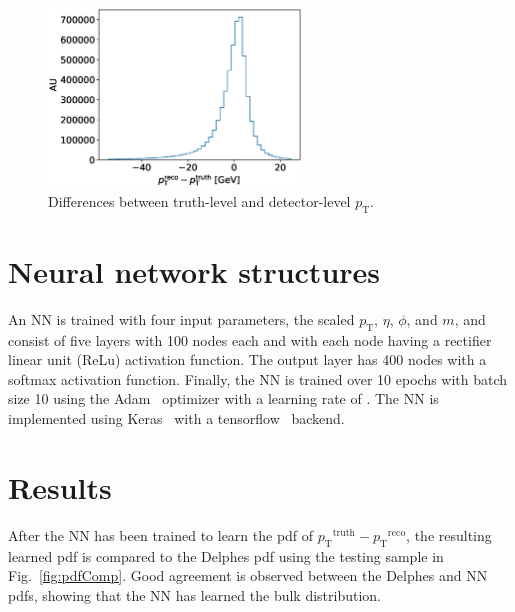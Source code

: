 \documentclass[showpacs,showkeys,preprint,prd,nofootinbib,linenumbers,12pt]{revtex4-1}
\def\pt{\ensuremath{p_{\mathrm{T}}}}
\def\ptRes{\ensuremath{\pt^{\mathrm{truth}}-\pt^{\mathrm{reco}}}}
\begin{document}
\begin{figure}[h]
  \includegraphics[width=0.6\textwidth]{figures/nn/pTRes_nobounds_prescaling.eps}
  \caption{Differences between truth-level and detector-level \pt.}
  \label{fig:deltaTarget}
\end{figure}

\section{Neural network structures}

An NN is trained with four input parameters, the scaled \pt, $\eta$, $\phi$, and $m$, and consist of five layers with 100 nodes each and with each node having a rectifier linear unit (ReLu) activation function. The output layer has 400 nodes with a softmax activation function. Finally, the NN is trained over 10 epochs with batch size 10 using the Adam~\cite{adam} optimizer with a learning rate of . The NN is implemented using Keras~\cite{chollet2015keras} with a tensorflow~\cite{tensorflow2015-whitepaper} backend.

\section{Results}

After the NN has been trained to learn the pdf of \ptRes, the resulting learned pdf is compared to the Delphes pdf using the testing sample in Fig.~\ref{fig:pdfComp}. Good agreement is observed between the Delphes and NN pdfs, showing that the NN has learned the bulk distribution.
\end{document}
